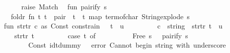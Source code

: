 \begin{isabellebody}
\ \ \ \ {\isacharbar}{\kern0pt}\ {\isacharunderscore}{\kern0pt}\ {\isacharequal}{\kern0pt}{\isachargreater}{\kern0pt}\ raise\ Match\isanewline
\isanewline
\ \ fun\ pairify\ s\ {\isacharequal}{\kern0pt}\isanewline
\ \ \ \ {\isacharparenleft}{\kern0pt}foldr{}\ {\isacharparenleft}{\kern0pt}fn\ {\isacharparenleft}{\kern0pt}t{}{\isacharcomma}{\kern0pt}\ t{}{\isacharparenright}{\kern0pt}\ {\isacharequal}{\kern0pt}{\isachargreater}{\kern0pt}\ \isactrlconst {\isasymopen}pair{\isasymclose}\ {\isachardollar}{\kern0pt}\ t{}\ {\isachardollar}{\kern0pt}\ t{}{\isacharparenright}{\kern0pt}\ {\isacharparenleft}{\kern0pt}map\ term{\isacharunderscore}{\kern0pt}of{\isacharunderscore}{\kern0pt}char\ {\isacharparenleft}{\kern0pt}String{\isachardot}{\kern0pt}explode\ s{\isacharparenright}{\kern0pt}{\isacharparenright}{\kern0pt}{\isacharparenright}{\kern0pt}\isanewline
\isanewline
\ \ fun\ str{\isacharunderscore}{\kern0pt}tr\ {\isacharbrackleft}{\kern0pt}{\isacharparenleft}{\kern0pt}c\ as\ Const\ {\isacharparenleft}{\kern0pt}\isactrlsyntaxUNDERSCOREconst {\isasymopen}{\isacharunderscore}{\kern0pt}constrain{\isasymclose}{\isacharcomma}{\kern0pt}\ {\isacharunderscore}{\kern0pt}{\isacharparenright}{\kern0pt}{\isacharparenright}{\kern0pt}\ {\isachardollar}{\kern0pt}\ t\ {\isachardollar}{\kern0pt}\ u{\isacharbrackright}{\kern0pt}\ {\isacharequal}{\kern0pt}\isanewline
\ \ \ \ \ \ \ \ c\ {\isachardollar}{\kern0pt}\ {\isacharparenleft}{\kern0pt}\isactrlconst {\isasymopen}string{\isasymclose}\ {\isachardollar}{\kern0pt}\ str{\isacharunderscore}{\kern0pt}tr\ {\isacharbrackleft}{\kern0pt}t{\isacharbrackright}{\kern0pt}{\isacharparenright}{\kern0pt}\ {\isachardollar}{\kern0pt}\ u\isanewline
\ \ \ \ {\isacharbar}{\kern0pt}\ str{\isacharunderscore}{\kern0pt}tr\ {\isacharbrackleft}{\kern0pt}t{\isacharbrackright}{\kern0pt}\ {\isacharequal}{\kern0pt}\isanewline
\ \ \ \ \ \ \ \ {\isacharparenleft}{\kern0pt}case\ t\ of\isanewline
\ \ \ \ \ \ \ \ \ \ Free\ {\isacharparenleft}{\kern0pt}s{\isacharcomma}{\kern0pt}\ {\isacharunderscore}{\kern0pt}{\isacharparenright}{\kern0pt}\ {\isacharequal}{\kern0pt}{\isachargreater}{\kern0pt}\ pairify\ s\isanewline
\ \ \ \ \ \ \ \ {\isacharbar}{\kern0pt}\ Const\ {\isacharparenleft}{\kern0pt}{\isachardoublequote}{\kern0pt}{\isacharunderscore}{\kern0pt}idtdummy{\isachardoublequote}{\kern0pt}{\isacharcomma}{\kern0pt}\ {\isacharunderscore}{\kern0pt}{\isacharparenright}{\kern0pt}\ {\isacharequal}{\kern0pt}{\isachargreater}{\kern0pt}\ error\ {\isachardoublequote}{\kern0pt}Cannot\ begin\ string\ with\ underscore{\isachardoublequote}{\kern0pt}\isanewline

\end{isabellebody}
